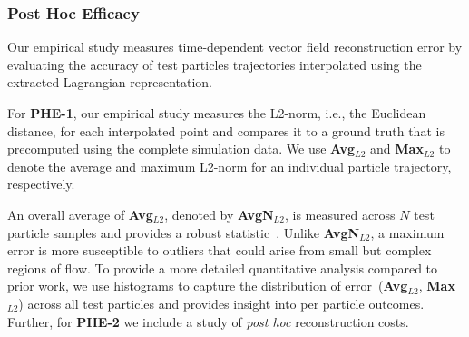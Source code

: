 \subsubsection{Post Hoc Efficacy}
\label{sec:evaluation}
Our empirical study measures time-dependent vector field reconstruction error by evaluating the accuracy of test particles trajectories interpolated using the extracted Lagrangian representation.
%
%
%

For \textbf{PHE-1}, our empirical study measures the L2-norm, i.e., the Euclidean distance, for each interpolated point and compares it to a ground truth that is precomputed using the complete simulation data. 
%
We use \textbf{Avg$_{L2}$} and \textbf{Max$_{L2}$} to denote the average and maximum L2-norm for an individual particle trajectory, respectively.
%
%

An overall average of \textbf{Avg$_{L2}$}, denoted by \textbf{AvgN$_{L2}$}, is measured across $N$ test particle samples and provides a robust statistic~\cite{agranovsky2014improved, sane2018revisiting, sane2019interpolation, rapp2019void}.
%
Unlike \textbf{AvgN$_{L2}$}, a maximum error is more susceptible to outliers that could arise from small but complex regions of flow.
%
To provide a more detailed quantitative analysis compared to prior work, we use histograms to capture the distribution of error~(\textbf{Avg$_{L2}$}, \textbf{Max$_{L2}$}) across all test particles and provides insight into per particle outcomes.  
%
Further, for \textbf{PHE-2} we include a study of \textit{post hoc} reconstruction costs. 

%
